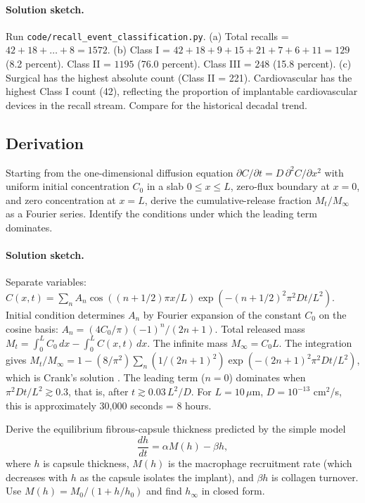 \paragraph{Solution sketch.}
Run \texttt{code/recall\_event\_classification.py}. (a) Total
recalls = $42 + 18 + \ldots + 8 = 1572$. (b) Class I = $42 + 18 +
9 + 15 + 21 + 7 + 6 + 11 = 129$ (8.2 percent). Class II = $1195$
(76.0 percent). Class III = $248$ (15.8 percent). (c) Surgical
has the highest absolute count (Class II = 221). Cardiovascular
has the highest Class I count (42), reflecting the proportion of
implantable cardiovascular devices in the recall stream.
Compare \cite{paper:v6c12-amato-recall-data-2014} for the
historical decadal trend.

\subsection*{Derivation}

\begin{exercise}
Starting from the one-dimensional diffusion equation
$\partial C / \partial t = D \, \partial^2 C / \partial x^2$ with
uniform initial concentration $C_0$ in a slab $0 \le x \le L$,
zero-flux boundary at $x = 0$, and zero concentration at $x = L$,
derive the cumulative-release fraction $M_t / M_\infty$ as a
Fourier series. Identify the conditions under which the leading
term dominates.
\end{exercise}

\paragraph{Solution sketch.}
Separate variables: $C(x, t) = \sum_n A_n \cos((n + 1/2)\pi x / L)
\exp(-(n+1/2)^2 \pi^2 D t / L^2)$. Initial condition determines
$A_n$ by Fourier expansion of the constant $C_0$ on the cosine
basis: $A_n = (4 C_0 / \pi) (-1)^n / (2n + 1)$. Total released
mass $M_t = \int_0^L C_0 \, dx - \int_0^L C(x, t) \, dx$. The
infinite mass $M_\infty = C_0 L$. The integration gives
$M_t/M_\infty = 1 - (8/\pi^2) \sum_n (1/(2n+1)^2)
\exp(-(2n+1)^2 \pi^2 D t / L^2)$, which is Crank's solution
\cite{paper:v6c12-crank-diffusion-1975}. The leading term ($n = 0$)
dominates when $\pi^2 D t / L^2 \gtrsim 0.3$, that is, after
$t \gtrsim 0.03 \, L^2/D$. For $L = 10 \,\mu\text{m}$, $D = 10^{-13}
$ cm$^2$/s, this is approximately 30,000 seconds = 8 hours.

\begin{exercise}
Derive the equilibrium fibrous-capsule thickness predicted by the
simple model
\[
\frac{dh}{dt} = \alpha M(h) - \beta h,
\]
where $h$ is capsule thickness, $M(h)$ is the macrophage
recruitment rate (which decreases with $h$ as the capsule
isolates the implant), and $\beta h$ is collagen turnover.
Use $M(h) = M_0 / (1 + h/h_0)$ and find $h_\infty$ in closed form.
\end{exercise}

